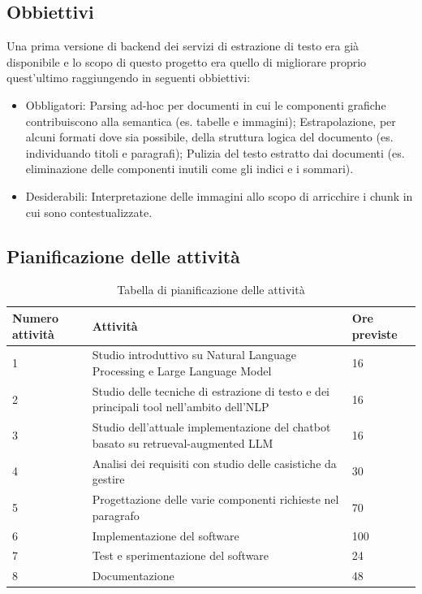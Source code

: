 \subsection{Obbiettivi}
Una prima versione di backend dei servizi di estrazione di testo era già disponibile e lo scopo di questo progetto era quello di migliorare proprio quest'ultimo raggiungendo in seguenti obbiettivi:

\begin{itemize}
    \item Obbligatori:
    \subitem Parsing ad-hoc per documenti in cui le componenti grafiche contribuiscono alla semantica (es. tabelle e immagini);
    \subitem Estrapolazione, per alcuni formati dove sia possibile, della struttura logica del documento (es. individuando titoli e paragrafi);
    \subitem Pulizia del testo estratto dai documenti (es. eliminazione delle componenti inutili come gli indici e i sommari).
    \item Desiderabili:
    \subitem Interpretazione delle immagini allo scopo di arricchire i chunk in cui sono contestualizzate. 
\end{itemize}

\subsection{Pianificazione delle attività}
\begin{table}[H]
    \centering
    \begin{tabular}{p{2cm} p{8cm} p{2cm}}
        \hline
        Numero attività & Attività & Ore previste \\
        \hline
        1 & Studio introduttivo su Natural Language Processing e Large Language Model & 16 \\
        \hline
        2 & Studio delle tecniche di estrazione di testo e dei principali tool nell'ambito dell'NLP & 16 \\
        \hline
        3 & Studio dell'attuale implementazione del chatbot basato su retrueval-augmented LLM & 16 \\
        \hline
        4 & Analisi dei requisiti con studio delle casistiche da gestire & 30 \\
        \hline
        5 & Progettazione delle varie componenti richieste nel paragrafo  & 70 \\
        \hline
        6 & Implementazione del software & 100 \\
        \hline
        7 & Test e sperimentazione del software & 24 \\
        \hline
        8 & Documentazione & 48 \\
        \hline
    \end{tabular}
    \caption{Tabella di pianificazione delle attività}
\end{table}

